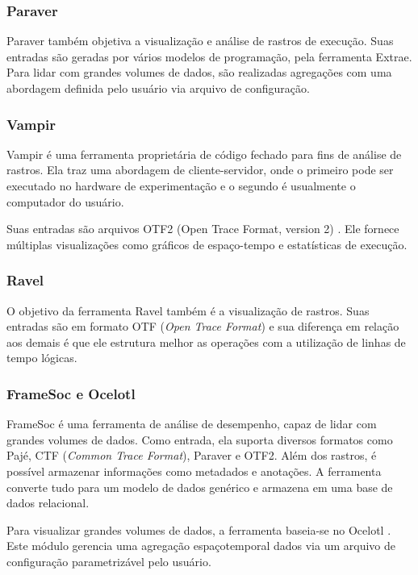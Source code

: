 \subsubsection*{Paraver}
Paraver \cite{ref:paraver} também objetiva a visualização e análise de 
rastros de execução. Suas entradas são geradas por vários modelos de 
programação, pela ferramenta Extrae. Para lidar com grandes volumes de 
dados, são realizadas agregações com uma abordagem definida pelo usuário 
via arquivo de configuração.


\subsubsection*{Vampir}
Vampir \cite{ref:vampir} é uma ferramenta proprietária de código fechado para 
fins de análise de rastros. Ela traz uma abordagem de cliente-servidor, 
onde o primeiro pode ser executado no hardware de experimentação e o segundo é
usualmente o computador do usuário.

Suas entradas são arquivos OTF2 (Open Trace Format, version 2) \cite{ref:otf2}.  
Ele fornece múltiplas visualizações como gráficos de espaço-tempo e estatísticas 
de execução.

\subsubsection*{Ravel}
O objetivo da ferramenta Ravel \cite{ref:ravel} também é a visualização de 
rastros. Suas entradas são em formato OTF (\textit{Open Trace Format}) e 
sua diferença em relação aos demais é que ele estrutura melhor as 
operações com a utilização de linhas de tempo lógicas.

\subsubsection*{FrameSoc e Ocelotl}

FrameSoc \cite{ref:framesoc} é uma ferramenta de análise de desempenho, capaz 
de lidar com grandes volumes de dados. Como entrada, ela suporta diversos
formatos como Pajé, CTF (\textit{Common Trace Format}), Paraver e OTF2. Além 
dos rastros, é possível armazenar informações como metadados e anotações. A 
ferramenta converte tudo para um modelo de dados genérico e armazena em uma base 
de dados relacional.

Para visualizar grandes volumes de dados, a ferramenta baseia-se no Ocelotl 
\cite{ref:ocelotl}. Este módulo gerencia uma agregação espaçotemporal dados via 
um arquivo de configuração parametrizável pelo usuário.

